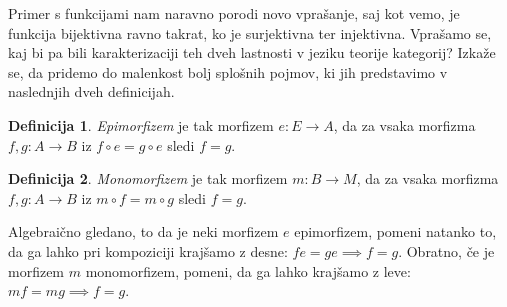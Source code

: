 \documentclass[12pt,a4paper]{book}
\theoremstyle{definition}
\newtheorem{definicija}{Definicija}[chapter]
\theoremstyle{plain}
\theoremstyle{definition}
\theoremstyle{remark}
\begin{document}
Primer s funkcijami nam naravno porodi novo vprašanje, saj kot vemo, je funkcija bijektivna ravno takrat, ko je surjektivna ter injektivna. Vprašamo se, kaj bi pa bili karakterizaciji teh dveh lastnosti v jeziku teorije kategorij? Izkaže se, da pridemo do malenkost bolj splošnih pojmov, ki jih predstavimo v naslednjih dveh definicijah.

\begin{definicija}
\emph{Epimorfizem} je tak morfizem $e : E \to A$, da za vsaka morfizma $f,g : A \to B$ iz $f \circ e = g \circ e$ sledi $f = g$.
\end{definicija}

\begin{definicija}
\emph{Monomorfizem} je tak morfizem $m : B \to M$, da za vsaka morfizma $f,g : A \to B$ iz $m \circ f = m \circ g$ sledi $f = g$.
\end{definicija}

Algebraično gledano, to da je neki morfizem $e$ epimorfizem, pomeni natanko to, da ga lahko pri kompoziciji krajšamo z desne: $fe = ge \implies f=g$. Obratno, če je morfizem $m$ monomorfizem, pomeni, da ga lahko krajšamo z leve: $mf = mg \implies f = g$.
\end{document}
